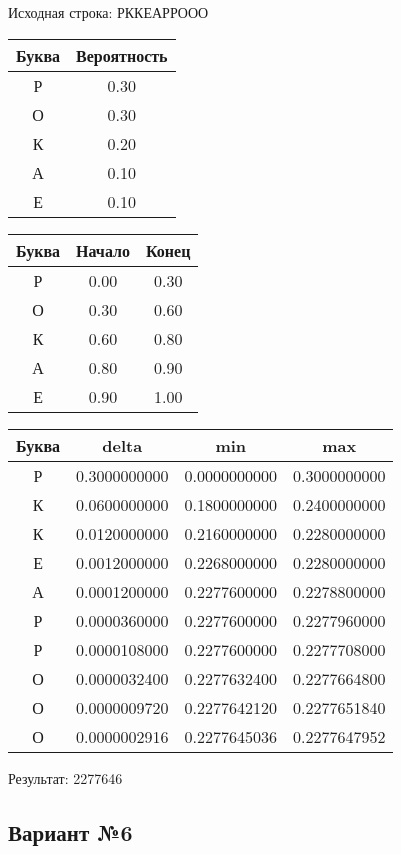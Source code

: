 \documentclass[a4paper, 12pt]{article}
\begin{document}
Исходная строка: РККЕАРРООО\
\begin{center}
 \begin{tabular}{ |c|c| } 
  \hline
     Буква & Вероятность \\ \hline
Р & 0.30\\\hline
О & 0.30\\\hline
К & 0.20\\\hline
А & 0.10\\\hline
Е & 0.10
\\ \hline \end{tabular}
\end{center}
\begin{center}
 \begin{tabular}{ |c|c|c| } 
  \hline
     Буква & Начало & Конец \\ \hline
Р & 0.00 & 0.30\\\hline
О & 0.30 & 0.60\\\hline
К & 0.60 & 0.80\\\hline
А & 0.80 & 0.90\\\hline
Е & 0.90 & 1.00
\\ \hline \end{tabular}
\end{center}
\begin{center}
 \begin{tabular}{ |c|c|c|c| } 
  \hline
     Буква & delta & min & max \\ \hline
Р & 0.3000000000 & 0.0000000000 & 0.3000000000\\\hline
К & 0.0600000000 & 0.1800000000 & 0.2400000000\\\hline
К & 0.0120000000 & 0.2160000000 & 0.2280000000\\\hline
Е & 0.0012000000 & 0.2268000000 & 0.2280000000\\\hline
А & 0.0001200000 & 0.2277600000 & 0.2278800000\\\hline
Р & 0.0000360000 & 0.2277600000 & 0.2277960000\\\hline
Р & 0.0000108000 & 0.2277600000 & 0.2277708000\\\hline
О & 0.0000032400 & 0.2277632400 & 0.2277664800\\\hline
О & 0.0000009720 & 0.2277642120 & 0.2277651840\\\hline
О & 0.0000002916 & 0.2277645036 & 0.2277647952
\\ \hline \end{tabular}
\end{center}
Результат: 2277646
\pagebreak
\subsection{Вариант №6}
\end{document}

